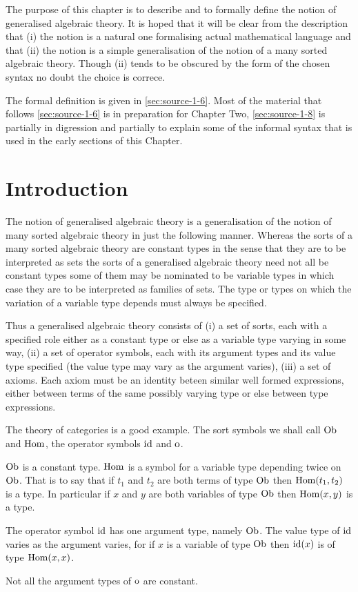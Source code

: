 
The purpose of this chapter is to describe and to formally define the notion of generalised algebraic theory.
%
It is hoped that it will be clear from the description that (i) the notion is a natural one formalising actual mathematical language and that (ii) the notion is a simple generalisation of the notion of a many sorted algebraic theory.
%
Though (ii) tends to be obscured by the form of the chosen syntax no doubt the choice is correce.

The formal definition is given in \textsection \ref{sec:source-1-6}.
%
Most of the material that follows \textsection \ref{sec:source-1-6} is in preparation for Chapter Two, \textsection \ref{sec:source-1-8} is partially in digression and partially to explain some of the informal syntax that is used in the early sections of this Chapter.


\section{Introduction}

The notion of generalised algebraic theory is a generalisation of the notion of many sorted algebraic theory in just the following manner.
%
Whereas the sorts of a many sorted algebraic theory are constant types in the sense that they are to be interpreted as sets the sorts of a generalised algebraic theory need not all be constant types some of them may be nominated to be variable types in which case they are to be interpreted as families of sets.
%
The type or types on which the variation of a variable type depends must always be specified.

Thus a generalised algebraic theory consists of (i) a set of sorts, each with a specified role either as a constant type or else as a variable type varying in some way, (ii) a set of operator symbols, each with its argument types and its value type specified (the value type may vary as the argument varies), (iii) a set of axioms.
%
%
Each axiom must be an identity beteen similar well formed expressions, either between terms of the same possibly varying type or else between type expressions.

The theory of categories is a good example.
%
The sort symbols we shall call $\mathrm{Ob}$ and $\mathrm{Hom}$, the operator symbols $\mathrm{id}$ and $\mathrm{o}$.

$\mathrm{Ob}$ is a constant type.  $\mathrm{Hom}$ is a symbol for a variable type depending twice on $\mathrm{Ob}$.
%
That is to say that if $t_1$ and $t_2$ are both terms of type $\mathrm{Ob}$ then $\mathrm{Hom}(t_1,t_2)$ is a type.
%
In particular if $x$ and $y$ are both variables of type $\mathrm{Ob}$ then $\mathrm{Hom}(x,y)$ is a type.


The operator symbol $\mathrm{id}$ has one argument type, namely $\mathrm{Ob}$.
%
The value type of $\mathrm{id}$ varies as the argument varies, for if $x$ is a variable of type $\mathrm{Ob}$ then $\mathrm{id}(x)$ is of type $\mathrm{Hom}(x,x)$.

Not all the argument types of $\mathrm{o}$ are constant.
%

